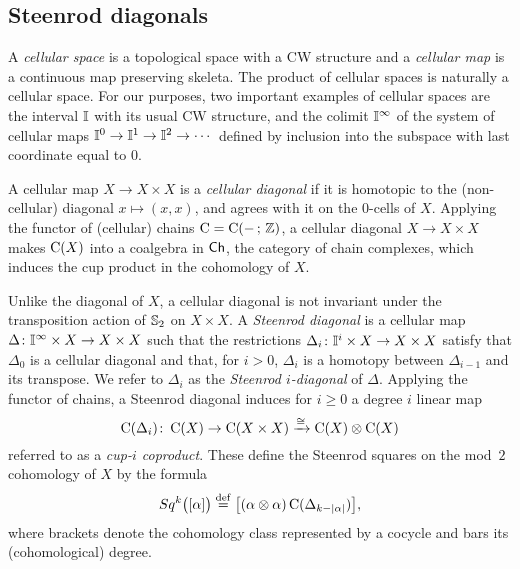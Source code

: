 
\subsection{Steenrod diagonals}

A \textit{cellular space} is a topological space with a CW structure and a \textit{cellular map} is a continuous map preserving skeleta.
The product of cellular spaces is naturally a cellular space.
For our purposes, two important examples of cellular spaces are the interval $\mathbb{I}$ with its usual CW structure, and the colimit $\mathbb{I}^\infty$ of the system of cellular maps $\mathbb{I}^0 \to \mathbb{I}^1 \to \mathbb{I}^2 \to \dotsb$ defined by inclusion into the subspace with last coordinate equal to $0$.

A cellular map $X \to X \times X$ is a \textit{cellular diagonal} if it is homotopic to the (non-cellular) diagonal $x \mapsto (x, x)$, and agrees with it on the $0$-cells of $X$.
Applying the functor of (cellular) chains $\operatorname{C} = \operatorname{C}(-\, ;\, \mathbb{Z})$, a cellular diagonal $X \to X \times X$ makes $\operatorname{C}(X)$ into a coalgebra in $\mathsf{Ch}$, the category of chain complexes, which induces the cup product in the cohomology of $X$.

Unlike the diagonal of $X$, a cellular diagonal is not invariant under the transposition action of $\mathbb{S}_2$ on $X \times X$.
A \textit{Steenrod diagonal} is a cellular map $\Delta \colon \mathbb{I}^\infty \times X \to X \times X$ such that the restrictions $\Delta_i \colon \mathbb{I}^i \times X \to X \times X$ satisfy that $\Delta_0$ is a cellular diagonal and that, for $i > 0$, $\Delta_i$ is a homotopy between $\Delta_{i-1}$ and its transpose.
We refer to $\Delta_i$ as the \textit{Steenrod $i$-diagonal} of $\Delta$.
Applying the functor of chains, a Steenrod diagonal induces for $i \geq 0$ a degree $i$ linear map
\[
\operatorname{C}(\Delta_i) \colon \operatorname{C}(X) \to \operatorname{C}(X \times X) \xrightarrow{\cong} \operatorname{C}(X) \otimes \operatorname{C}(X)
\]
referred to as a \textit{cup-$i$ coproduct}.
These define the Steenrod squares on the mod~$2$ cohomology of $X$ by the formula
\[
Sq^k\big( [\alpha] \big) \stackrel{\mathrm{def}}{=} \big[ (\alpha \otimes \alpha)\operatorname{C}(\Delta_{k-\lvert\alpha\rvert}) \big],
\]
where brackets denote the cohomology class represented by a cocycle and bars its (cohomological) degree.


